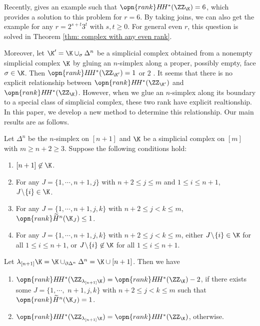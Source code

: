 Recently, \cite{Han-2023} gives an example such that $\opn{rank} H\!H^*(\ZZ_{\K})=6$,
which provides a solution to this problem for $r=6$.
By taking joins, we can also get the 
example for any $r=2^{s+t}3^t$ with $s,t\ge 0$.
For general even $r$, this question is solved in Theorem \ref{thm: complex with any even rank}.

Moreover, let $\K'=\K\cup_{\sigma} \Delta^n$
be a simplicial complex obtained from a nonempty
simplicial complex $\K$ by gluing an $n$-simplex along a proper, possibly empty, face $\sigma\in \K$.
Then $\opn{rank} H\!H^*(\ZZ_{\K'})=1$ or $2$ \cite[Theorem 6.7]{LPSS-2023}.
It seems that there is no explicit relationship between $\opn{rank} H\!H^*(\ZZ_{\K'})$ and $\opn{rank} H\!H^*(\ZZ_{\K})$. However, when we glue
an $n$-simplex along its boundary to a special class of simplicial complex,
these two rank have explicit realtionship. In this paper, we develop 
a new method to determine this relationship.
Our main results are as follows.

\begin{thm}
    \label{thm: change of rank}
    Let $\Delta^n$ be the $n$-simplex on $[n+1]$ and $\K$ be a simplicial complex on $[m]$ with $m\ge n+2\ge 3$. Suppose the following conditions hold:
    \begin{enumerate}
    \item 
    $[n+1]\not\in \K$.
    \item 
    For any $J=\{1,\cdots,n+1,j\}$ with $n+2\le j\le m$ and $1\le i\le n+1$,
    $J\!\setminus\! \{i\}\in \K$.
    \item 
    For any $J=\{1,\cdots,n+1,j,k\}$ with $n+2\le j<k\le m$, 
    $\opn{rank} \widetilde{H}^n(\K_J)\le 1$.
    \item 
    For any $J=\{1,\cdots,n+1,j,k\}$ with $n+2\le j<k\le m$,
    either $J\!\setminus\! \{i\}\in\K$ for all $1\le i\le n+1$, 
    or $J\!\setminus\! \{i\}\not\in\K$ for all $1\le i\le n+1$.
    \end{enumerate}
    Let $\lambda_{[n+1]}\K=\K\cup_{\partial\Delta^n}\Delta^n
    =\K\cup [n+1]$. Then we have
    \begin{enumerate}
    \item 
    $\opn{rank} H\!H^*(\ZZ_{\lambda_{[n+1]}\K})=\opn{rank} H\!H^*(\ZZ_{\K})-2$, if there exists some $J=\{1,\cdots,$ $n+1,j,k\}$ with $n+2\le j<k\le m$ such that $\opn{rank} \widetilde{H}^n(\K_J)=1$.
    \item 
    $\opn{rank} H\!H^*(\ZZ_{\lambda_{[n+1]}\K})=\opn{rank} H\!H^*(\ZZ_{\K})$,
    otherwise.
    \end{enumerate}
\end{thm}

